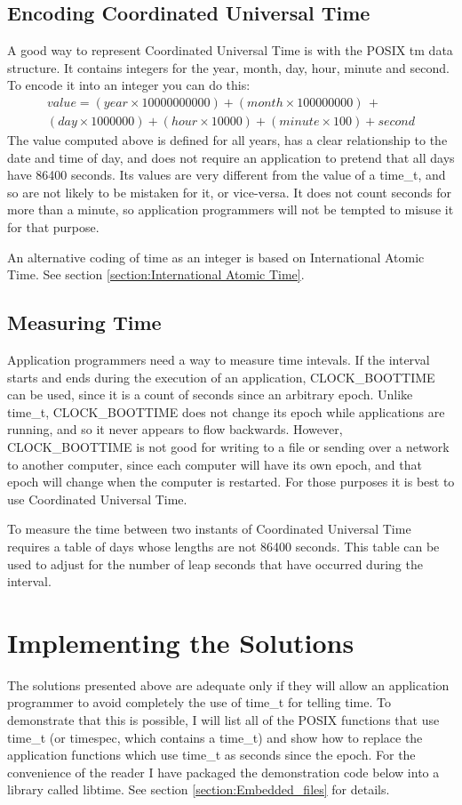 \documentclass[letterpaper,twoside]{article}
\begin{document}
\subsection{Encoding Coordinated Universal Time}
A good way to represent Coordinated Universal Time is with the
POSIX {\ttfamily tm} data
structure.  It contains integers for the year, month, day, hour, minute
and second.  To encode it into an integer you can do this:
\begin{multline*}
  value = (year \times 10000000000) + (month \times 100000000) \, + \\
  (day \times 1000000) + (hour \times 10000) + (minute \times 100) + second
\end{multline*}
The value computed above is defined for all years, has a clear relationship
to the date and time of day, and does not require an application to pretend
that all days have \num{86400} seconds.  Its values are very different from
the value of a {\ttfamily time\_t}, and so are not likely to be mistaken for
it, or vice-versa.  It does not count seconds for more than a minute, so
application programmers will not be tempted to misuse it for that purpose.

An alternative coding of time as an integer is based on International
Atomic Time.  See section \ref{section:International Atomic Time}.

\subsection{Measuring Time}
Application programmers need a way to measure time intevals.
If the interval starts and ends during the execution of an application,
CLOCK\_BOOTTIME
can be used, since it is a count of seconds since an arbitrary epoch.
Unlike {\ttfamily time\_t}, CLOCK\_BOOTTIME does not change its epoch while
applications are running, and so it never appears to flow
backwards.  However, CLOCK\_BOOTTIME is not good for writing to a file
or sending
over a network to another computer, since each computer will have
its own epoch, and that epoch will change when the computer is restarted.
For those purposes it is best to use Coordinated Universal Time.

To measure the time between two instants of Coordinated Universal Time
requires a table of days whose lengths are not \num{86400} seconds.
This table
can be used to adjust for the number of leap seconds that have occurred
during the interval.

\section{Implementing the Solutions}
The solutions presented above are adequate only if they will allow an
application
programmer to avoid completely the use of {\ttfamily time\_t} for telling time.
To demonstrate that this is possible,
I will list all of the POSIX functions 
that use {\ttfamily time\_t}
(or timespec, which contains a {\ttfamily time\_t}) 
and show how to
replace the application functions which use {\ttfamily time\_t} as
seconds since the epoch.
For the convenience of the reader I have packaged the demonstration code
below into a library called {\ttfamily libtime}.
See section \ref{section:Embedded_files} for details.
\end{document}
